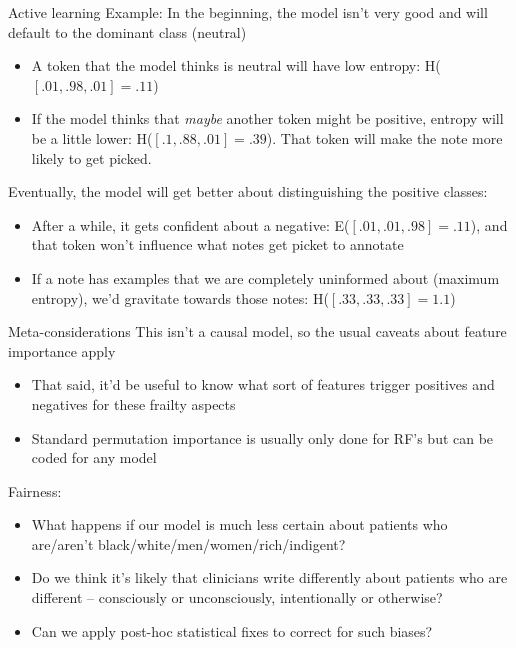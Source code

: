\documentclass[10pt]{beamer}
\begin{document}
\begin{frame}{Active learning}
Example:  In the beginning, the model isn't very good and will default to the dominant class (neutral)
\begin{itemize}
\item A token that the model thinks is neutral will have low entropy:  H($[.01, .98, .01] = .11$)
\item If the model thinks that \textit{maybe} another token might be positive, entropy will be a little lower:  H($[.1, .88, .01] = .39$).  That token will make the note more likely to get picked.
\end{itemize}
Eventually, the model will get better about distinguishing the positive classes:
\begin{itemize}
\item After a while, it gets confident about a negative:  E($[.01, .01, .98] = .11$), and that token won't influence what notes get picket to annotate
\item If a note has examples that we are completely uninformed about (maximum entropy), we'd gravitate towards those notes:  H($[.33, .33, .33] = 1.1$)
\end{itemize}
\end{frame}

\begin{frame}{Meta-considerations}
This isn't a causal model, so the usual caveats about feature importance apply
\begin{itemize}
\item That said, it'd be useful to know what sort of features trigger positives and negatives for these frailty aspects
\item Standard permutation importance is usually only done for RF's but can be coded for any model
\end{itemize}
Fairness:
\begin{itemize}
\item What happens if our model is much less certain about patients who are/aren't black/white/men/women/rich/indigent?
\item Do we think it's likely that clinicians write differently about patients who are different -- consciously or unconsciously, intentionally or otherwise?
\item Can we apply post-hoc statistical fixes to correct for such biases?
\end{itemize}
\end{frame}
\end{document}
